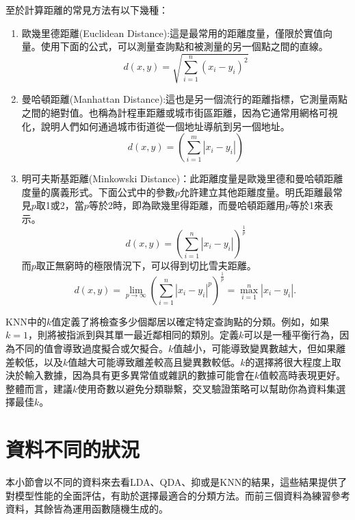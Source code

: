 至於計算距離的常見方法有以下幾種：
\begin{enumerate}
\item 歐幾里德距離(Euclidean Distance):這是最常用的距離度量，僅限於實值向量。使用下面的公式，可以測量查詢點和被測量的另一個點之間的直線。
$$d(x,y)=\sqrt{\sum_{i=1}^n(x_i-y_i)^2}$$
\item 曼哈頓距離(Manhattan Distance):這也是另一個流行的距離指標，它測量兩點之間的絕對值。也稱為計程車距離或城市街區距離，因為它通常用網格可視化，說明人們如何通過城市街道從一個地址導航到另一個地址。
$$d(x,y)=(\sum_{i=1}^m\left|x_i-y_i\right|)$$
\item 明可夫斯基距離(Minkowski Distance)：此距離度量是歐幾里德和曼哈頓距離度量的廣義形式。下面公式中的參數$p$允許建立其他距離度量。明氏距離最常見$p$取1或2，當$p$等於2時，即為歐幾里得距離，而曼哈頓距離用$p$等於1來表示。
$$d(x,y)=(\sum_{i=1}^n\left|x_i-y_i\right|)^{\frac{1}{p}}$$
而$p$取正無窮時的極限情況下，可以得到切比雪夫距離。
$$d(x,y)={\displaystyle \lim _{p\to \infty }{\left(\sum _{i=1}^{n}|x_{i}-y_{i}|^{p}\right)^{\frac {1}{p}}}=\max _{i=1}^{n}|x_{i}-y_{i}|.\,}$$
\end{enumerate}
KNN中的$k$值定義了將檢查多少個鄰居以確定特定查詢點的分類。例如，如果$k=1$，則將被指派到與其單一最近鄰相同的類別。定義$k$可以是一種平衡行為，因為不同的值會導致過度擬合或欠擬合。$k$值越小，可能導致變異數越大，但如果離差較低，以及$k$值越大可能導致離差較高且變異數較低。$k$的選擇將很大程度上取決於輸入數據，因為具有更多異常值或雜訊的數據可能會在$k$值較高時表現更好。整體而言，建議$k$使用奇數以避免分類聯繫，交叉驗證策略可以幫助你為資料集選擇最佳$k$。
\section{資料不同的狀況}
本小節會以不同的資料來去看LDA、QDA、抑或是KNN的結果，這些結果提供了對模型性能的全面評估，有助於選擇最適合的分類方法。而前三個資料為練習參考資料，其餘皆為運用函數隨機生成的。


